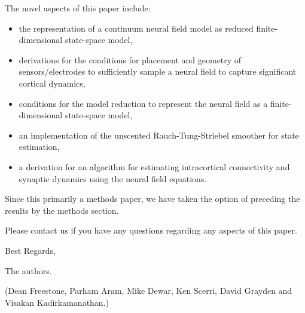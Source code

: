 \documentclass[]{article}
\begin{document}
The novel aspects of this paper include:
\begin{itemize}
	\item the representation of a continuum neural field model as reduced finite-dimensional state-space model,
	\item derivations for the conditions for placement and geometry of sensors/electrodes to sufficiently sample a neural field to capture significant cortical dynamics,
	\item conditions for the model reduction to represent the neural field as a finite-dimensional state-space model,
	\item an implementation of the unscented Rauch-Tung-Striebel smoother for state estimation,
	\item a derivation for an algorithm for estimating intracortical connectivity and synaptic dynamics using the neural field equations.
\end{itemize}

Since this primarily a methods paper, we have taken the option of preceding the results by the methods section.

Please contact us if you have any questions regarding any aspects of this paper.

Best Regards,

The authors.

(Dean Freestone, Parham Aram, Mike Dewar, Ken Scerri, David Grayden and Visakan Kadirkamanathan.)


\end{document}

